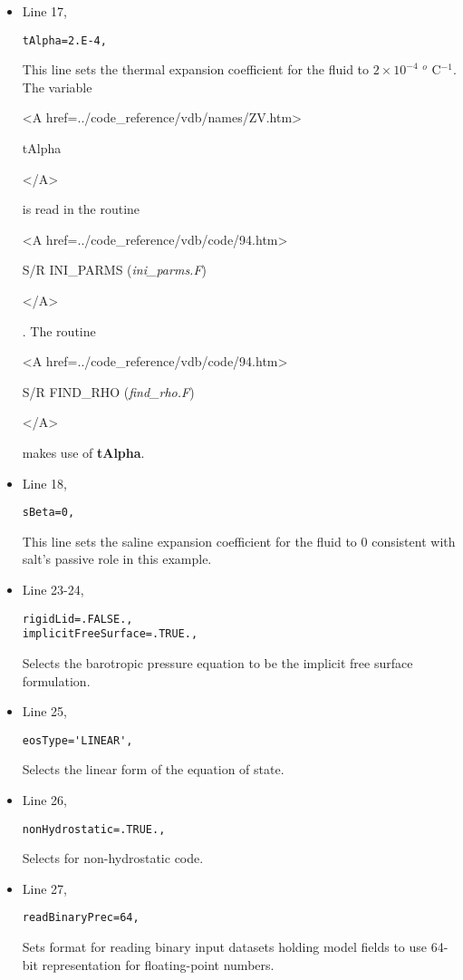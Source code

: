 \begin{itemize}
\item Line 17,
\begin{verbatim}
tAlpha=2.E-4,
\end{verbatim}
This line sets the thermal expansion coefficient for the fluid
to $2 \times 10^{-4}$ $^o$ C$^{-1}$.
The variable
{\bf
\begin{rawhtml} <A href=../code_reference/vdb/names/ZV.htm> \end{rawhtml}
tAlpha 
\begin{rawhtml} </A>\end{rawhtml}
}
is read in the routine
{\it
\begin{rawhtml} <A href=../code_reference/vdb/code/94.htm> \end{rawhtml}
S/R INI\_PARMS ({\it ini\_parms.F})
\begin{rawhtml} </A>\end{rawhtml}
}. 
The routine 
{\it
\begin{rawhtml} <A href=../code_reference/vdb/code/94.htm> \end{rawhtml}
S/R FIND\_RHO ({\it find\_rho.F})
\begin{rawhtml} </A>\end{rawhtml}
} makes use of {\bf tAlpha}.

\item Line 18,
\begin{verbatim}
sBeta=0,
\end{verbatim}
This line sets the saline expansion coefficient for the fluid
to $0$ consistent with salt's passive role in this example.


\item Line 23-24,
\begin{verbatim}
rigidLid=.FALSE., 
implicitFreeSurface=.TRUE., 
\end{verbatim}
Selects the barotropic pressure equation to be the implicit free surface
formulation.

\item Line 25,
\begin{verbatim}
eosType='LINEAR',
\end{verbatim}
Selects the linear form of the equation of state.


\item Line 26,
\begin{verbatim}
nonHydrostatic=.TRUE.,
\end{verbatim}
Selects for non-hydrostatic code.


\item Line 27,
\begin{verbatim}
readBinaryPrec=64,
\end{verbatim}
Sets format for reading binary input datasets holding model fields to
use 64-bit representation for floating-point numbers.


\end{itemize}
